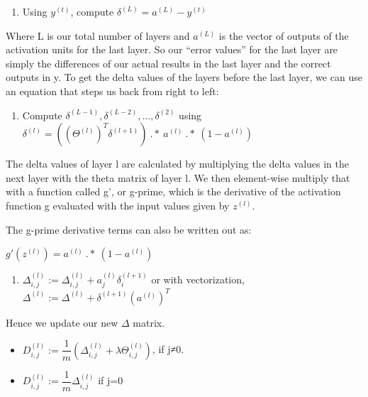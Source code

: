 \documentclass[
]{book}
\providecommand{\tightlist}{%
  \setlength{\itemsep}{0pt}\setlength{\parskip}{0pt}}
\begin{document}
\begin{enumerate}
\def\labelenumi{\arabic{enumi}.}
\setcounter{enumi}{2}
\tightlist
\item
  Using \(y^{(t)}\), compute \(\delta^{(L)} = a^{(L)} - y^{(t)}\)
\end{enumerate}

Where L is our total number of layers and \(a^{(L)}\) is the vector of outputs of the activation units for the last layer. So our ``error values'' for the last layer are simply the differences of our actual results in the last layer and the correct outputs in y. To get the delta values of the layers before the last layer, we can use an equation that steps us back from right to left:

\begin{enumerate}
\def\labelenumi{\arabic{enumi}.}
\setcounter{enumi}{3}
\tightlist
\item
  Compute \(\delta^{(L-1)}, \delta^{(L-2)},\dots,\delta^{(2)}\) using \(\delta^{(l)} = ((\Theta^{(l)})^T \delta^{(l+1)})\ .*\ a^{(l)}\ .*\ (1 - a^{(l)})\)
\end{enumerate}

The delta values of layer l are calculated by multiplying the delta values in the next layer with the theta matrix of layer l. We then element-wise multiply that with a function called g', or g-prime, which is the derivative of the activation function g evaluated with the input values given by \(z^{(l)}\).

The g-prime derivative terms can also be written out as:

\(g'(z^{(l)}) = a^{(l)}\ .*\ (1 - a^{(l)})\)

\begin{enumerate}
\def\labelenumi{\arabic{enumi}.}
\setcounter{enumi}{4}
\tightlist
\item
  \(\Delta^{(l)}_{i,j} := \Delta^{(l)}_{i,j} + a_j^{(l)} \delta_i^{(l+1)}\) or with vectorization, \(\Delta^{(l)} := \Delta^{(l)} + \delta^{(l+1)}(a^{(l)})^T\)
\end{enumerate}

Hence we update our new \(\Delta\) matrix.

\begin{itemize}
\tightlist
\item
  \(D^{(l)}_{i,j} := \dfrac{1}{m}\left(\Delta^{(l)}_{i,j} + \lambda\Theta^{(l)}_{i,j}\right)\), if j≠0.
\item
  \(D^{(l)}_{i,j} := \dfrac{1}{m}\Delta^{(l)}_{i,j}\) if j=0
\end{itemize}
\end{document}
